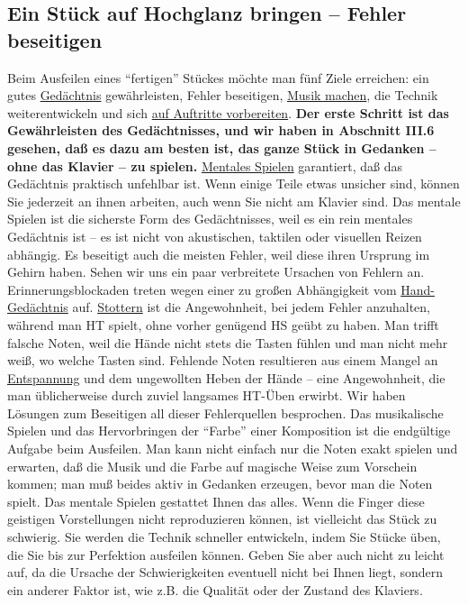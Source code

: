 
\subsection{Ein Stück auf Hochglanz bringen -- Fehler beseitigen}
\label{c1iii9}

Beim Ausfeilen eines \enquote{fertigen} Stückes möchte man fünf Ziele erreichen: ein gutes \hyperref[c1iii6]{Gedächtnis} gewährleisten, Fehler beseitigen, \hyperref[c1iii14d]{Musik machen}, die Technik weiterentwickeln und sich \hyperref[c1iii14]{auf Auftritte vorbereiten}.
\textbf{Der erste Schritt ist das Gewährleisten des Gedächtnisses, und wir haben in Abschnitt III.6 gesehen, daß es dazu am besten ist, das ganze Stück in Gedanken -- ohne das Klavier -- zu spielen.}
\hyperref[c1ii12]{Mentales Spielen} garantiert, daß das Gedächtnis praktisch unfehlbar ist.
Wenn einige Teile etwas unsicher sind, können Sie jederzeit an ihnen arbeiten, auch wenn Sie nicht am Klavier sind.
Das mentale Spielen ist die sicherste Form des Gedächtnisses, weil es ein rein mentales Gedächtnis ist -- es ist nicht von akustischen, taktilen oder visuellen Reizen abhängig.
Es beseitigt auch die meisten Fehler, weil diese ihren Ursprung im Gehirn haben.
Sehen wir uns ein paar verbreitete Ursachen von Fehlern an.
Erinnerungsblockaden treten wegen einer zu großen Abhängigkeit vom \hyperref[c1iii6hand]{Hand-Gedächtnis} auf.
\hyperref[c1ii22]{Stottern} ist die Angewohnheit, bei jedem Fehler anzuhalten, während man HT spielt, ohne vorher genügend HS geübt zu haben.
Man trifft falsche Noten, weil die Hände nicht stets die Tasten fühlen und man nicht mehr weiß, wo welche Tasten sind.
Fehlende Noten resultieren aus einem Mangel an \hyperref[c1ii14]{Entspannung} und dem ungewollten Heben der Hände -- eine Angewohnheit, die man üblicherweise durch zuviel langsames HT-Üben erwirbt.
Wir haben Lösungen  zum Beseitigen all dieser Fehlerquellen besprochen.
Das musikalische Spielen und das Hervorbringen der \enquote{Farbe} einer Komposition ist die endgültige Aufgabe beim Ausfeilen.
Man kann nicht einfach nur die Noten exakt spielen und erwarten, daß die Musik und die Farbe auf magische Weise zum Vorschein kommen; man muß beides aktiv in Gedanken erzeugen, bevor man die Noten spielt.
Das mentale Spielen gestattet Ihnen das alles.
Wenn die Finger diese geistigen Vorstellungen nicht reproduzieren können, ist vielleicht das Stück zu schwierig.
Sie werden die Technik schneller entwickeln, indem Sie Stücke üben, die Sie bis zur Perfektion ausfeilen können.
Geben Sie aber auch nicht zu leicht auf, da die Ursache der Schwierigkeiten eventuell nicht bei Ihnen liegt, sondern ein anderer Faktor ist, wie z.B. die Qualität oder der Zustand des Klaviers.

